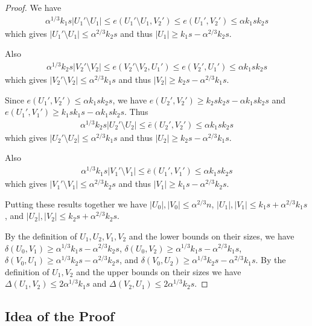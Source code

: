 \documentclass[oneside,12pt]{memoir}
\begin{document}
\begin{proof}
We have 
\begin{align*}
\alpha^{1/3}k_1s|U_1'\setminus U_1|\leq e(U_1'\setminus U_1,V_2')\leq e(U_1',V_2')\leq \alpha k_1sk_2s 
\end{align*}
which gives $|U_1'\setminus U_1|\leq \alpha^{2/3}k_2s$ and thus $|U_1|\geq k_1s-\alpha^{2/3}k_2s$.

Also 
\begin{align*}
\alpha^{1/3}k_2s|V_2'\setminus V_2|\leq e(V_2'\setminus V_2,U_1')\leq e(V_2',U_1')\leq \alpha k_1sk_2s
\end{align*}
which gives $|V_2'\setminus V_2|\leq \alpha^{2/3}k_1s$ and thus $|V_2|\geq k_2s-\alpha^{2/3}k_1s$.

Since $e(U_1',V_2')\leq \alpha k_1sk_2s$, we have $e(U_2',V_2')\geq k_2sk_2s-\alpha k_1sk_2s$ and $e(U_1',V_1')\geq k_1sk_1s-\alpha k_1sk_2s$.  Thus 
\begin{align*}
\alpha^{1/3}k_2s|U_2'\setminus U_2|\leq \bar{e}(U_2',V_2')\leq \alpha k_1sk_2s
\end{align*}
which gives $|U_2'\setminus U_2|\leq \alpha^{2/3}k_1s$ and thus $|U_2|\geq k_2s-\alpha^{2/3}k_1s$.

Also
\begin{align*}
\alpha^{1/3}k_1s|V_1'\setminus V_1|\leq \bar{e}(U_1',V_1')\leq \alpha k_1sk_2s
\end{align*}
which gives $|V_1'\setminus V_1|\leq \alpha^{2/3}k_2s$ and thus $|V_1|\geq k_1s-\alpha^{2/3}k_2s$.

Putting these results together we have $|U_0|,|V_0|\leq \alpha^{2/3} n$, $|U_1|,|V_1|\leq k_1s+\alpha^{2/3}k_1s$, and $|U_2|,|V_2|\leq k_2s+\alpha^{2/3}k_2s$.

By the definition of $U_1,U_2,V_1,V_2$ and the lower bounds on their sizes, we have $\delta(U_0,V_1)\geq \alpha^{1/3}k_1s-\alpha^{2/3}k_2s$, $\delta(U_0,V_2)\geq \alpha^{1/3}k_1s-\alpha^{2/3}k_1s$, $\delta(V_0,U_1)\geq \alpha^{1/3}k_2s-\alpha^{2/3}k_2s$, and $\delta(V_0,U_2)\geq \alpha^{1/3}k_2s-\alpha^{2/3}k_1s$.  By the definition of $U_1,V_2$ and the upper bounds on their sizes we have $\Delta(U_1,V_2)\leq 2\alpha^{1/3}k_1s$ and $\Delta(V_2,U_1)\leq 2\alpha^{1/3}k_2s$.


\end{proof}


\subsection{Idea of the Proof}
\end{document}
